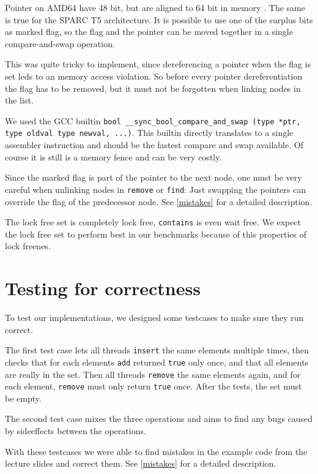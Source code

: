 Pointer on AMD64 have 48 bit, but are aligned to 64 bit in memory \cite[p. 120]{amd64ArchManual}. The same is true for the SPARC T5 architecture. It is possible to use one of the surplus bits as marked flag, so the flag and the pointer can be moved together in a single compare-and-swap operation. 

This was quite tricky to implement, since dereferencing a pointer when the flag is set leds to an memory access violation. So before every pointer dereferentiation the flag has to be removed, but it must not be forgotten when linking nodes in the list. 

We used the GCC builtin \texttt{bool \_\_sync\_bool\_compare\_and\_swap (type *ptr, type oldval type newval, ...)}. This builtin directly translates to a single assembler instruction and should be the fastest compare and swap available. Of course it is still is a memory fence and can be very costly.

Since the marked flag is part of the pointer to the next node, one must be very careful when unlinking nodes in \texttt{remove} or \texttt{find}: Just swapping the pointers can override the flag of the predecessor node. See \ref{mistakes} for a detailed description.

The lock free set is completely lock free, \texttt{contains} is even wait free. We expect the lock free set to perform best in our benchmarks because of this properties of lock freenes.


\section{Testing for correctness}
To test our implementations, we designed some testcases to make sure they run correct.

The first test case lets all threads \texttt{insert} the same elements multiple times, then checks that for each elements \texttt{add} returned \texttt{true} only once, and that all elements are really in the set. Then all threads \texttt{remove} the same elements again, and for each element, \texttt{remove} must only return \texttt{true} once. After the tests, the set must be empty.

The second test case mixes the three operations and aims to find any bugs caused by sideeffects between the operations.

With these testcases we were able to find mistakes in the example code from the lecture slides and correct them. See \ref{mistakes} for a detailed description.

